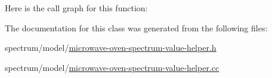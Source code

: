 Here is the call graph for this function\+:




The documentation for this class was generated from the following files\+:\begin{DoxyCompactItemize}
\item 
spectrum/model/\hyperlink{microwave-oven-spectrum-value-helper_8h}{microwave-\/oven-\/spectrum-\/value-\/helper.\+h}\item 
spectrum/model/\hyperlink{microwave-oven-spectrum-value-helper_8cc}{microwave-\/oven-\/spectrum-\/value-\/helper.\+cc}\end{DoxyCompactItemize}
